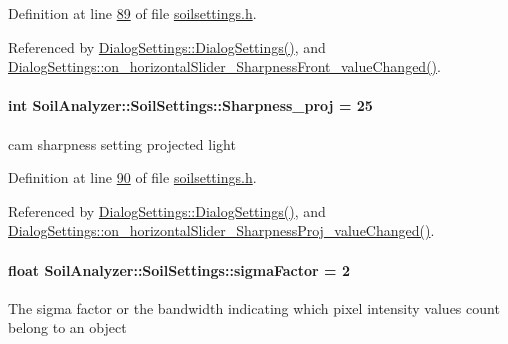 Definition at line \hyperlink{soilsettings_8h_source_l00089}{89} of file \hyperlink{soilsettings_8h_source}{soilsettings.\+h}.



Referenced by \hyperlink{dialogsettings_8cpp_source_l00005}{Dialog\+Settings\+::\+Dialog\+Settings()}, and \hyperlink{dialogsettings_8cpp_source_l00332}{Dialog\+Settings\+::on\+\_\+horizontal\+Slider\+\_\+\+Sharpness\+Front\+\_\+value\+Changed()}.

\hypertarget{class_soil_analyzer_1_1_soil_settings_a393383ada5fb2a451b89245de34b27de}{}
\paragraph[{Sharpness\+\_\+proj}]{\setlength{\rightskip}{0pt plus 5cm}int Soil\+Analyzer\+::\+Soil\+Settings\+::\+Sharpness\+\_\+proj = 25}\label{class_soil_analyzer_1_1_soil_settings_a393383ada5fb2a451b89245de34b27de}
cam sharpness setting projected light 

Definition at line \hyperlink{soilsettings_8h_source_l00090}{90} of file \hyperlink{soilsettings_8h_source}{soilsettings.\+h}.



Referenced by \hyperlink{dialogsettings_8cpp_source_l00005}{Dialog\+Settings\+::\+Dialog\+Settings()}, and \hyperlink{dialogsettings_8cpp_source_l00364}{Dialog\+Settings\+::on\+\_\+horizontal\+Slider\+\_\+\+Sharpness\+Proj\+\_\+value\+Changed()}.

\hypertarget{class_soil_analyzer_1_1_soil_settings_a97e62512e12a2ba9210fd93950b6e717}{}
\paragraph[{sigma\+Factor}]{\setlength{\rightskip}{0pt plus 5cm}float Soil\+Analyzer\+::\+Soil\+Settings\+::sigma\+Factor = 2}\label{class_soil_analyzer_1_1_soil_settings_a97e62512e12a2ba9210fd93950b6e717}
The sigma factor or the bandwidth indicating which pixel intensity values count belong to an object 


